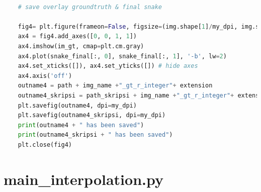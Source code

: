\begin{lstlisting}[language=Python, basicstyle=\tiny]
	
	# save overlay groundtruth & final snake
	
	fig4= plt.figure(frameon=False, figsize=(img.shape[1]/my_dpi, img.shape[0]/my_dpi), dpi=my_dpi)
	ax4 = fig4.add_axes([0, 0, 1, 1])
	ax4.imshow(im_gt, cmap=plt.cm.gray)
	ax4.plot(snake_final[:, 0], snake_final[:, 1], '-b', lw=2)
	ax4.set_xticks([]), ax4.set_yticks([]) # hide axes
	ax4.axis('off')
	outname4 = path + img_name +"_gt_r_integer"+ extension
	outname4_skripsi = path_skripsi + img_name +"_gt_r_integer"+ extension
	plt.savefig(outname4, dpi=my_dpi)
	plt.savefig(outname4_skripsi, dpi=my_dpi)
	print(outname4 + " has been saved")
	print(outname4_skripsi + " has been saved")
	plt.close(fig4)
\end{lstlisting}


\section{main\_interpolation.py}
